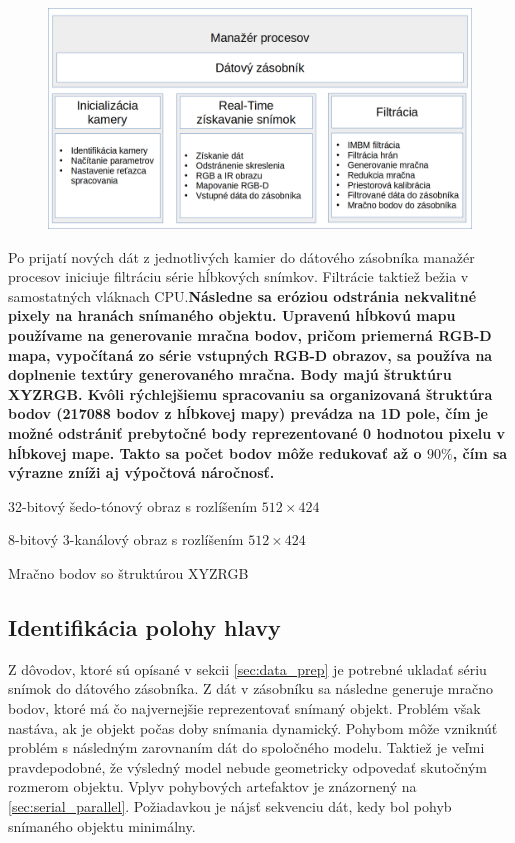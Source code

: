 \begin{figure}[H]
	\centering
	\includegraphics[width=\textwidth]{figures/algorithm_capture.png}
	\caption{}
	\label{fig:algorithm:process:a}
\end{figure}

Po prijatí nových dát z jednotlivých kamier do dátového zásobníka manažér procesov iniciuje filtráciu série hĺbkových snímkov. Filtrácie taktiež bežia v samostatných vláknach CPU.\textbf{Následne sa eróziou odstránia nekvalitné pixely na hranách snímaného objektu. Upravenú hĺbkovú mapu používame na generovanie mračna bodov, pričom priemerná RGB-D mapa, vypočítaná zo série vstupných RGB-D obrazov, sa používa na doplnenie textúry generovaného mračna. Body majú štruktúru XYZRGB. Kvôli rýchlejšiemu spracovaniu sa organizovaná štruktúra bodov (217088 bodov z hĺbkovej mapy) prevádza na 1D pole, čím je možné odstrániť prebytočné body reprezentované 0 hodnotou pixelu v hĺbkovej mape. Takto sa počet bodov môže redukovať až o $90\%$, čím sa výrazne zníži aj výpočtová náročnosť. }

\begin{description}[leftmargin=*, font=$\bullet$~\normalfont\scshape\color{black}]
	\item[Depth median:] 	32-bitový šedo-tónový obraz s rozlíšením $512 \times 424$
	\item[RGB-D median:]	8-bitový 3-kanálový obraz s rozlíšením $512 \times 424$
	\item[Median Point Cloud:] Mračno bodov so štruktúrou XYZRGB 
\end{description}

\subsection{Identifikácia polohy hlavy}

Z dôvodov, ktoré sú opísané v sekcii \ref{sec:data_prep} je potrebné ukladať sériu snímok do dátového zásobníka. Z dát v zásobníku sa následne generuje mračno bodov, ktoré má čo najvernejšie reprezentovať snímaný objekt. Problém však nastáva, ak je objekt počas doby snímania dynamický. Pohybom môže vzniknúť problém s následným zarovnaním dát do spoločného modelu. Taktiež je veľmi pravdepodobné, že výsledný model nebude geometricky odpovedať skutočným rozmerom objektu. Vplyv pohybových artefaktov je znázornený na \ref{sec:serial_parallel}. Požiadavkou je nájsť sekvenciu dát, kedy bol pohyb snímaného objektu minimálny. \newline 

